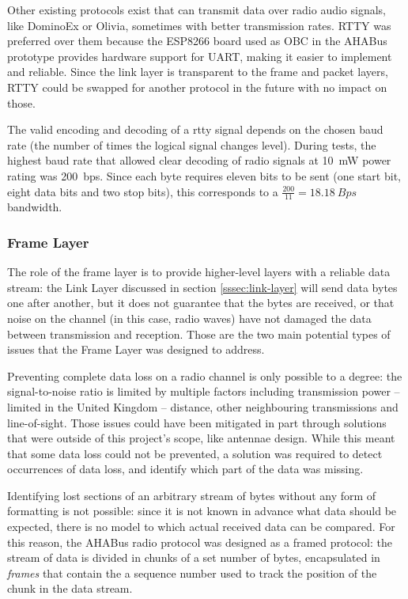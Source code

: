 Other existing protocols exist that can transmit data over radio audio signals,
like DominoEx or Olivia, sometimes with better transmission rates. RTTY was
preferred over them because the ESP8266 board used as OBC in the AHABus
prototype provides hardware support for UART, making it easier to implement and
reliable. Since the link layer is transparent to the frame and packet layers,
RTTY could be swapped for another protocol in the future with no impact on
those.

The valid encoding and decoding of a \acrshort{rtty} signal depends on the
chosen baud rate (the number of times the logical signal changes level). During
tests, the highest baud rate that allowed clear decoding of radio signals at
\SI{10}{mW} power rating was \SI{200}{bps}. Since each byte requires eleven
bits to be sent (one start bit, eight data bits and two stop bits), this
corresponds to a \(\frac{200}{11}=\SI{18.18}{Bps}\) bandwidth.

\subsubsection{Frame Layer}
\label{sssec:frame-layer}

The role of the frame layer is to provide higher-level layers with a reliable
data stream: the Link Layer discussed in section \ref{sssec:link-layer} will
send data bytes one after another, but it does not guarantee that the bytes are
received, or that noise on the channel (in this case, radio waves) have not
damaged the data between transmission and reception. Those are the two main
potential types of issues that the Frame Layer was designed to address.

Preventing complete data loss on a radio channel is only possible to a degree:
the signal-to-noise ratio is limited by multiple factors including transmission
power – limited in the United Kingdom – distance, other neighbouring
transmissions and line-of-sight. Those issues could have been mitigated in part
through solutions that were outside of this project's scope, like antennae
design. While this meant that some data loss could not be prevented, a solution
was required to detect occurrences of data loss, and identify which part of the
data was missing.

Identifying lost sections of an arbitrary stream of bytes without any form of
formatting is not possible: since it is not known in advance what data should
be expected, there is no model to which actual received data can be compared.
For this reason, the AHABus radio protocol was designed as a framed protocol:
the stream of data is divided in chunks of a set number of bytes, encapsulated
in \textit{frames} that contain the a sequence number used to track the position
of the chunk in the data stream.

